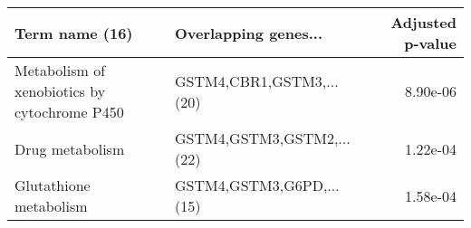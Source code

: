 \begin{tabular}{llr}
\toprule
                              Term name (16) &      Overlapping genes... &  Adjusted p-value \\
\midrule
Metabolism of xenobiotics by cytochrome P450 &  GSTM4,CBR1,GSTM3,...(20) &          8.90e-06 \\
                             Drug metabolism & GSTM4,GSTM3,GSTM2,...(22) &          1.22e-04 \\
                      Glutathione metabolism &  GSTM4,GSTM3,G6PD,...(15) &          1.58e-04 \\
\bottomrule
\end{tabular}
